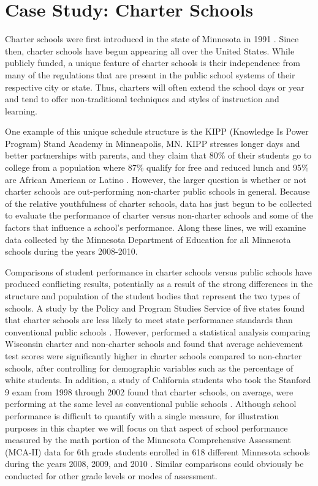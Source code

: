 \documentclass[
]{krantz}
\begin{document}
\section{Case Study: Charter Schools}\label{cs:charter}

Charter schools were first introduced in the state of Minnesota in 1991 \citep{CharterSchools}. Since then, charter schools have begun appearing all over the United States. While publicly funded, a unique feature of charter schools is their independence from many of the regulations that are present in the public school systems of their respective city or state. Thus, charters will often extend the school days or year and tend to offer non-traditional techniques and styles of instruction and learning.

One example of this unique schedule structure is the KIPP (Knowledge Is Power Program) Stand Academy in Minneapolis, MN. KIPP stresses longer days and better partnerships with parents, and they claim that 80\% of their students go to college from a population where 87\% qualify for free and reduced lunch and 95\% are African American or Latino \citep{KIPP}. However, the larger question is whether or not charter schools are out-performing non-charter public schools in general. Because of the relative youthfulness of charter schools, data has just begun to be collected to evaluate the performance of charter versus non-charter schools and some of the factors that influence a school's performance. Along these lines, we will examine data collected by the Minnesota Department of Education for all Minnesota schools during the years 2008-2010.

Comparisons of student performance in charter schools versus public schools have produced conflicting results, potentially as a result of the strong differences in the structure and population of the student bodies that represent the two types of schools. A study by the Policy and Program Studies Service of five states found that charter schools are less likely to meet state performance standards than conventional public schools \citep{Finnigan2004}. However, \citet{Witte2007} performed a statistical analysis comparing Wisconsin charter and non-charter schools and found that average achievement test scores were significantly higher in charter schools compared to non-charter schools, after controlling for demographic variables such as the percentage of white students. In addition, a study of California students who took the Stanford 9 exam from 1998 through 2002 found that charter schools, on average, were performing at the same level as conventional public schools \citep{Buddin2005}. Although school performance is difficult to quantify with a single measure, for illustration purposes in this chapter we will focus on that aspect of school performance measured by the math portion of the Minnesota Comprehensive Assessment (MCA-II) data for 6th grade students enrolled in 618 different Minnesota schools during the years 2008, 2009, and 2010 \citep{MNDepartmentOfEducation}. Similar comparisons could obviously be conducted for other grade levels or modes of assessment.
\end{document}
